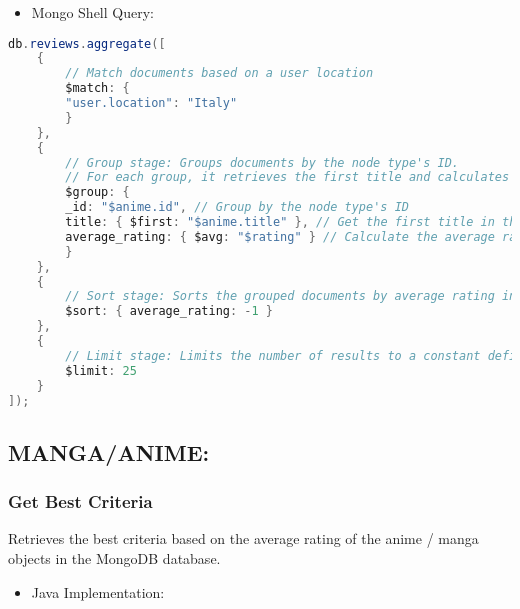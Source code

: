 \begin{itemize}
    \item Mongo Shell Query:
\end{itemize}

\begin{mdframed}[style=customstyle2]
\begin{lstlisting}[language=java, backgroundcolor=\color{white}]
db.reviews.aggregate([
    {
        // Match documents based on a user location
        $match: {
        "user.location": "Italy"
        }
    },
    {
        // Group stage: Groups documents by the node type's ID.
        // For each group, it retrieves the first title and calculates the average rating.
        $group: {
        _id: "$anime.id", // Group by the node type's ID
        title: { $first: "$anime.title" }, // Get the first title in the group
        average_rating: { $avg: "$rating" } // Calculate the average rating for the group
        }
    },
    {
        // Sort stage: Sorts the grouped documents by average rating in descending order.
        $sort: { average_rating: -1 }
    },
    {
        // Limit stage: Limits the number of results to a constant defined by 'Constants.PAGE_SIZE'.
        $limit: 25
    }
]);\end{lstlisting}
\end{mdframed}

\subsection*{MANGA/ANIME:}
\subsubsection*{Get Best Criteria}

Retrieves the best criteria based on the average rating of the anime / manga objects in the MongoDB database.
\begin{itemize}
    \item Java Implementation:
\end{itemize}

